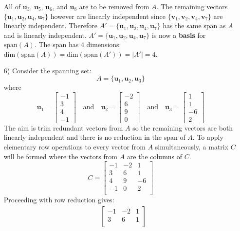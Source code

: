 \documentclass{article}
\begin{document}
\begin{itemize}
All of \(\mathbf{u}_3\), \(\mathbf{u}_5\), \(\mathbf{u}_6\), and \(\mathbf{u}_8\) are to be removed from \(A\). The remaining vectors \(\{\mathbf{u}_1, \mathbf{u}_2, \mathbf{u}_4, \mathbf{u}_7\}\) however are linearly independent since \(\{\mathbf{v}_1, \mathbf{v}_2, \mathbf{v}_4, \mathbf{v}_7\}\) are linearly independent. Therefore \(A' = \{\mathbf{u}_1, \mathbf{u}_2, \mathbf{u}_4, \mathbf{u}_7\}\) has the same span as \(A\) and is linearly independent. \(A' = \{\mathbf{u}_1, \mathbf{u}_2, \mathbf{u}_4, \mathbf{u}_7\}\) is now a {\bf basis} for \(\text{span}(A)\). The span has \(4\) dimensions: \(\text{dim}(\text{span}(A)) = \text{dim}(\text{span}(A')) = |A'| = 4\).
\item[6)] Consider the spanning set:
\[A = \{\mathbf{u}_1, \mathbf{u}_2, \mathbf{u}_3\}\]
where
\[\mathbf{u}_1 = \begin{bmatrix}
-1 \\ 3 \\ 4 \\ -1   
\end{bmatrix} \quad\text{and}\quad \mathbf{u}_2 =\begin{bmatrix} 
-2 \\ 6 \\ 9 \\ 0  
\end{bmatrix} \quad\text{and}\quad \mathbf{u}_3 = \begin{bmatrix} 
1 \\ 1 \\ -6 \\ 2 
\end{bmatrix}\] 
The aim is trim redundant vectors from \(A\) so the remaining vectors are both linearly independent and there is no reduction in the span of \(A\). To apply elementary row operations to every vector from \(A\) simultaneously, a matrix \(C\) will be formed where the vectors from \(A\) are the columns of \(C\). 
\[C = \begin{bmatrix}
-1 & -2 &  1 \\
 3 &  6 &  1 \\
 4 &  9 & -6 \\
-1 &  0 &  2 \\ 
\end{bmatrix}\]
Proceeding with row reduction gives:
\begin{align*}
& \begin{bmatrix}
-1 & -2 &  1 \\
 3 &  6 &  1 \\

\end{bmatrix}
\end{align*}
\end{itemize}
\end{document}
